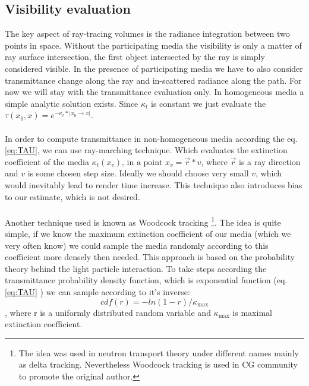 
\subsection{Visibility evaluation}
The key aspect of ray-tracing volumes is the radiance integration between two points in space. Without the participating media the visibility is only a matter of ray surface intersection, the first object intersected by the ray is simply considered visible. In the presence of participating media we have to also consider transmittance change along the ray and in-scattered radiance along the path. For now we will stay with the transmittance evaluation only. In homogeneous media a simple analytic solution exists. Since $\kappa_t$ is constant we just evaluate the $  \tau(x_{0},x)=e^{-\kappa_t*\left | x_{0}\rightarrow x \right |}$.
\\
\\
In order to compute transmittance in non-homogeneous media according the eq. \ref{eq:TAU}, we can use ray-marching technique. Which evaluates the extinction coefficient of the media $\kappa_t(x_{v})\text{, in a point }x_{v}=\vec{r}*v$, where $\vec{r}$ is a ray direction and $v$ is some chosen step size. Ideally we should choose very small $v$, which would inevitably lead to render time increase. This technique also introduces bias to our estimate, which is not desired.
\\
\\
Another technique used is known as Woodcock tracking \footnote{ The idea was used in neutron transport theory under different names mainly as delta tracking. Nevertheless Woodcock tracking is used in CG community to promote the original author.}. The idea is quite simple, if we know the maximum extinction coefficient of our media (which we very often know) we could sample the media randomly according to this coefficient more densely then needed. This approach is based on the probability theory behind the light particle interaction. To take steps according the transmittance probability density function, which is exponential function (eq. \ref{eq:TAU} ) we can sample according to it's inverse:
\begin{equation}
cdf(r)=-ln(1-r)/\kappa_\text{max}
\end{equation}
, where r is a uniformly distributed random variable and $\kappa_\text{max}$ is maximal extinction coefficient.


